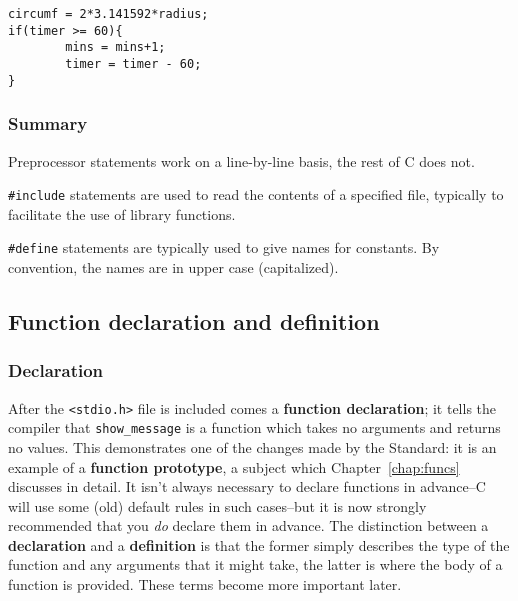     \begin{Verbatim}
circumf = 2*3.141592*radius;
if(timer >= 60){
        mins = mins+1;
        timer = timer - 60;
}
\end{Verbatim}

   

   \subsubsection{Summary}
    Preprocessor statements work on a line-by-line basis, the rest of C does
     not.

    \texttt{\#include} statements are used to read the contents of a
     specified file, typically to facilitate the use of library functions.

    \texttt{\#define} statements are typically used to give names for
     constants. By convention, the names are in upper case (capitalized).

   
  

  \subsection{Function declaration and definition}
   

   \subsubsection{Declaration}
    

    After the \texttt{<stdio.h>} file is included comes a
     \textbf{function declaration}; it tells the compiler that
     \texttt{show\_message} is a function which takes no arguments and
     returns no values. This demonstrates one of the changes made by the
     Standard: it is an example of a \textbf{function prototype}, a subject
     which Chapter~\ref{chap:funcs} discusses in detail. It isn't always
     necessary to declare functions in advance--C will use some (old)
     default rules in such cases--but it is now strongly recommended that
     you \textit{do} declare them in advance. The distinction between a
     \textbf{declaration} and a \textbf{definition} is that the former
     simply describes the type of the function and any arguments that it might
     take, the latter is where the body of a function is provided. These terms
     become more important later.


